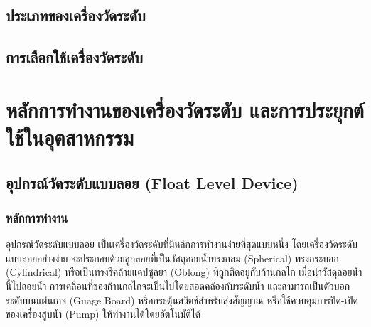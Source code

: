 \documentclass[final,11pt]{article}
\begin{document}
\subsection{ประเภทของเครื่องวัดระดับ}
\subsection{การเลือกใช้เครื่องวัดระดับ}

\newpage
\section{หลักการทำงานของเครื่องวัดระดับ และการประยุกต์ใช้ในอุตสาหกรรม}
\subsection{อุปกรณ์วัดระดับแบบลอย (Float Level Device)}
\subsubsection{หลักการทำงาน} 
อุปกรณ์วัดระดับแบบลอย เป็นเครื่องวัดระดับที่มีหลักการทำงานง่ายที่สุดแบบหนึ่ง
โดยเครื่องวัดระดับแบบลอยอย่างง่าย จะประกอบด้วยลูกลอยที่เป็นวัสดุลอยน้ำทรงกลม (Spherical) ทรงกระบอก (Cylindrical)
หรือเป็นทรงรีคล้ายแคปซูลยา (Oblong) ที่ถูกติดอยู่กับก้านกลไก เมื่อนำวัสดุลอยน้ำนี้ไปลอยน้ำ การเคลื่อนที่ของก้านกลไกจะเป็นไปโดยสอดคล้องกับระดับน้ำ
และสามารถเป็นตัวบอกระดับบนแผ่นเกจ (Guage Board) หรือกระตุ้นสวิตช์สำหรับส่งสัญญาณ หรือใช้ควบคุมการปิด-เปิดของเครื่องสูบน้ำ (Pump) ให้ทำงานได้โดยอัตโนมัติได้  
\end{document}
